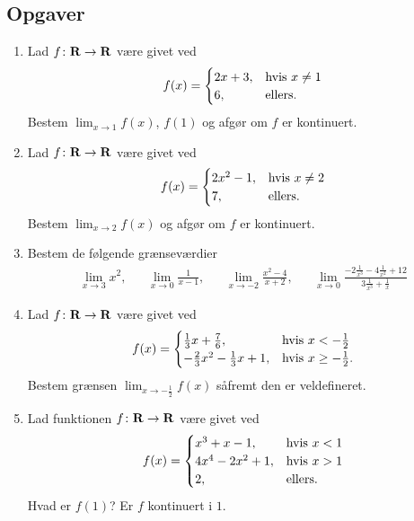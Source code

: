 \subsection{Opgaver}

\begin{enumerate}
	\item Lad $f\colon \mathbf{R}\to \mathbf{R}$ være givet ved
	\begin{align*}
	f(x)=\begin{cases}
	2x+3,& \textup{hvis } x\neq 1\\
	6,&\textup{ellers}.
	\end{cases}
	\end{align*}
	Bestem $\lim_{x\to 1}f(x)$, $f(1)$ og afgør om $f$ er kontinuert.
	
	
	\item Lad $f\colon \mathbf{R}\to \mathbf{R}$ være givet ved
	\begin{align*}
	f(x)=\begin{cases}
	2x^2-1,& \textup{hvis } x\neq 2\\
	7,&\textup{ellers}.
	\end{cases}
	\end{align*}
	Bestem $\lim_{x\to 2}f(x)$ og afgør om $f$ er kontinuert.

	
	
	\item Bestem de følgende grænseværdier
	\begin{align*}
	\lim_{x\to 3} x^2,&& \lim_{x\to 0} \frac{1}{x-1},&&\lim_{x\to -2} \frac{x^2-4}{x+2},&& \lim_{x\to 0} \frac{-2\frac{1}{x^3}-4\frac{1}{x^2}+12}{3\frac{1}{x^3}+\frac{1}{x}}
	\end{align*}
	


	
	
	\item Lad $f\colon \mathbf{R}\to \mathbf{R}$ være givet ved
	\begin{align*}
	f(x)=\begin{cases}
	\frac{1}{3}x+\frac{7}{6}, & \textup{hvis } x<-\frac{1}{2}\\
	-\frac{2}{3}x^2-\frac{1}{3}x+1,& \textup{hvis } x\geq -\frac{1}{2}.
	\end{cases}	
	\end{align*}
	Bestem grænsen $\lim_{x\to -\frac{1}{2}} f(x)$ såfremt den er veldefineret. 
	
	\item Lad funktionen $f\colon \mathbf{R}\to \mathbf{R}$ være givet ved
	\begin{align*}
	f(x)=\begin{cases}
	x^3+x-1,&\textup{hvis } x<1\\
	4x^4-2x^2+1,&\textup{hvis } x>1\\
	2,& \textup{ellers}.
	\end{cases}
	\end{align*}
	Hvad er $f(1)$? Er $f$ kontinuert i $1$.
	

\end{enumerate}
